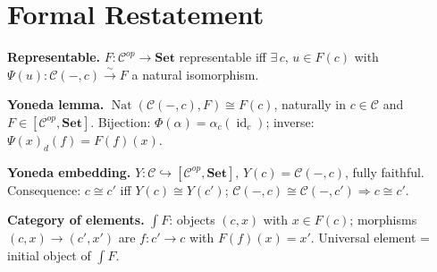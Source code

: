 \section{Formal Restatement}

\begin{formalrestatement}
\textbf{Representable.} $F : \mathcal{C}^{op} \to \mathbf{Set}$ representable
iff $\exists\, c,\, u \in F(c)$ with $\Psi(u) : \mathcal{C}(-,c) \xrightarrow{\sim} F$
a natural isomorphism.

\textbf{Yoneda lemma.}
$\operatorname{Nat}(\mathcal{C}(-,c), F) \cong F(c)$, naturally in $c \in \mathcal{C}$
and $F \in [\mathcal{C}^{op},\mathbf{Set}]$.
Bijection: $\Phi(\alpha) = \alpha_c(\operatorname{id}_c)$;
inverse: $\Psi(x)_d(f) = F(f)(x)$.

\textbf{Yoneda embedding.}
$Y : \mathcal{C} \hookrightarrow [\mathcal{C}^{op},\mathbf{Set}]$, $Y(c) = \mathcal{C}(-,c)$,
fully faithful. Consequence: $c \cong c'$ iff $Y(c) \cong Y(c')$;
$\mathcal{C}(-,c) \cong \mathcal{C}(-,c') \Rightarrow c \cong c'$.

\textbf{Category of elements.}
$\int F$: objects $(c,x)$ with $x \in F(c)$; morphisms $(c,x) \to (c',x')$
are $f : c' \to c$ with $F(f)(x) = x'$. Universal element = initial object of $\int F$.
\end{formalrestatement}
